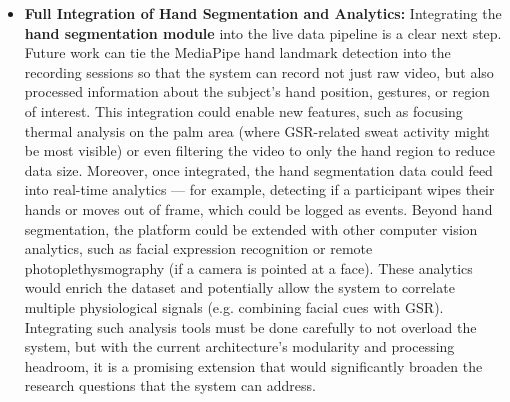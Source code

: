 \documentclass[11pt,a4paper]{report}
\begin{document}
\begin{itemize}
\item \textbf{Full Integration of Hand Segmentation and Analytics:}
  Integrating the \textbf{hand segmentation module} into the live data
  pipeline is a clear next step. Future work can tie the MediaPipe hand
  landmark detection into the recording sessions so that the system can
  record not just raw video, but also processed information about the
  subject's hand position, gestures, or region of interest. This
  integration could enable new features, such as focusing thermal
  analysis on the palm area (where GSR-related sweat activity might be
  most visible) or even filtering the video to only the hand region to
  reduce data size. Moreover, once integrated, the hand segmentation
  data could feed into real-time analytics --- for example, detecting if
  a participant wipes their hands or moves out of frame, which could be
  logged as events. Beyond hand segmentation, the platform could be
  extended with other computer vision analytics, such as facial
  expression recognition or remote photoplethysmography (if a camera is
  pointed at a face). These analytics would enrich the dataset and
  potentially allow the system to correlate multiple physiological
  signals (e.g. combining facial cues with GSR). Integrating such
  analysis tools must be done carefully to not overload the
  system, but with the current architecture's modularity and processing
  headroom, it is a promising extension that would significantly broaden
  the research questions that the system can address.


\end{itemize}
\end{document}
